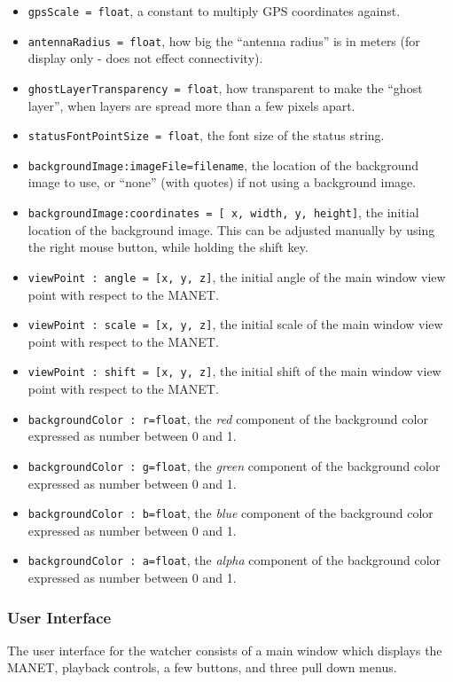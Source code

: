 \begin{itemize}
\item {\tt gpsScale = float}, a constant to multiply GPS coordinates against.
\item {\tt antennaRadius = float}, how big the ``antenna radius'' is in meters (for display only - does not effect connectivity). 
\item {\tt ghostLayerTransparency = float}, how transparent to make the ``ghost layer'', when layers are spread more than a few pixels apart.
\item {\tt statusFontPointSize = float}, the font size of the status string. 
\item {\tt backgroundImage:imageFile=filename}, the location of the background image to use, or ``none'' (with quotes) if not using a background image.
\item {\tt backgroundImage:coordinates = [ x, width, y, height]}, the initial location of the background image. This can be adjusted manually by using the right mouse button, while holding the shift key.
\item {\tt viewPoint : angle = [x, y, z]}, the initial angle of the main window view point with respect to the MANET.
\item {\tt viewPoint : scale = [x, y, z]}, the initial scale of the main window view point with respect to the MANET.
\item {\tt viewPoint : shift = [x, y, z]}, the initial shift of the main window view point with respect to the MANET.
\item {\tt backgroundColor : r=float}, the {\it red} component of the background color expressed as number between 0 and 1.
\item {\tt backgroundColor : g=float}, the {\it green} component of the background color expressed as number between 0 and 1.
\item {\tt backgroundColor : b=float}, the {\it blue} component of the background color expressed as number between 0 and 1.
\item {\tt backgroundColor : a=float}, the {\it alpha} component of the background color expressed as number between 0 and 1.
\end{itemize}

\subsubsection{User Interface}
The user interface for the watcher consists of a main window which displays the MANET, playback controls, a few buttons, and three pull down menus.


